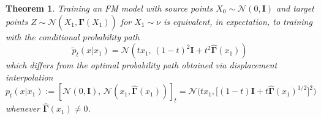 \documentclass{article} %
\newtheorem{theorem}{Theorem}
\newcommand{\N}{\mathcal{N}}
\newcommand{\I}{\mathbf{I}}
\newcommand{\G}{\widehat{\mathbf{\Gamma}}}
\begin{document}
\begin{theorem}\label{naiveaugmentation}
\label{thm: augmentation is non OT}
Training an FM model with source points $X_0\sim \N(0,\I)$ and target points $Z 
\sim \N(X_1, \G(X_1))$ for $X_1 \sim \nu$ is equivalent, in expectation, to training with the conditional probability path
%
\begin{equation}
\label{eq:augmentation equivalent path}
\tilde{p}_t(x|x_1) = \N(tx_1,\, (1-t)^2\I + t^2\G(x_1))
\end{equation}
%
which differs from the optimal probability path obtained via displacement interpolation 
\begin{equation}
%
p_t(x | x_1)
:= [\N(0, \I),\, \N(x_1, \G(x_1))]_t = \N\big(t x_1, \big[(1-t)\I + t\G (x_1)^{1/2}\big]^2 \big)
\end{equation}
%
whenever $\G (x_1) \neq 0$.
\end{theorem}
\end{document}
